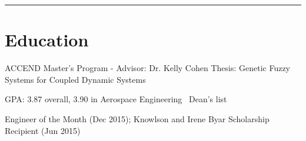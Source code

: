 \documentclass[letterpaper]{deedy-resume}
\begin{document}
\begin{minipage}[t]{0.66\textwidth}
\sectionspace
\rule{12cm}{0.5pt}\vspace{2ex}
	\section{Education}
	
	\begin{compactitem}
		\item ACCEND Master's Program - Advisor: Dr. Kelly Cohen
				\subitem Thesis: Genetic Fuzzy Systems for Coupled Dynamic Systems
	\end{compactitem}

    \vspace{1em}
	\location{2013\textendash 2017}
	{}
	
	\begin{compactitem}
		\item GPA: 3.87 overall, 3.90 in Aerospace Engineering \textemdash\ Dean's list
		\item Engineer of the Month (Dec 2015); Knowlson and Irene Byar Scholarship Recipient (Jun 2015)
	\end{compactitem}






\end{minipage}
\end{document}
